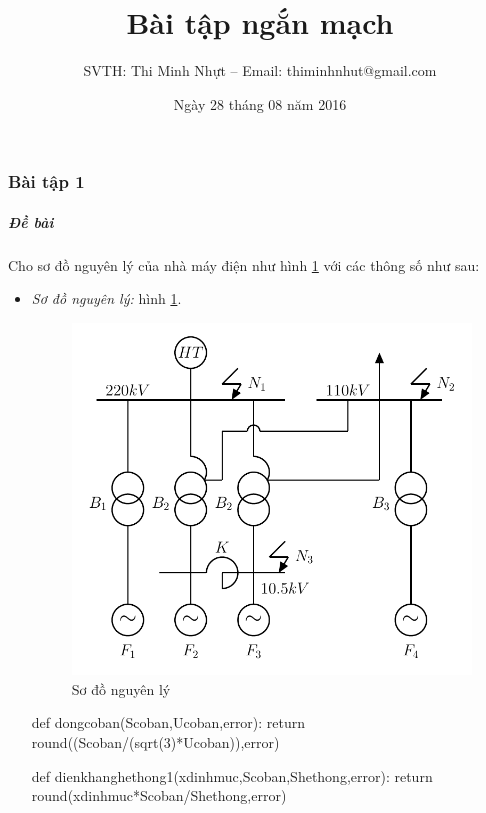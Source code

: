 \documentclass[12pt,a4paper]{article}
\title{\textbf{Bài tập ngắn mạch}}
\author{SVTH: Thi Minh Nhựt -- Email: thiminhnhut@gmail.com}
\date{Ngày 28 tháng 08 năm 2016}
\begin{document}
\maketitle
\everymath{\displaystyle}
\subsubsection*{Bài tập 1}
\subparagraph{Đề bài} Cho sơ đồ nguyên lý của nhà máy điện như hình \ref{Fig:baitap-ngan-mach-1} với các thông số như sau:
\begin{itemize}
\item \textit{Sơ đồ nguyên lý:} hình \ref{Fig:baitap-ngan-mach-1}.
\begin{figure}[!h]
\begin{center}
\includegraphics[scale=1]{figure-baitap-nganmach-1.pdf}
\end{center}
\caption{Sơ đồ nguyên lý}\label{Fig:baitap-ngan-mach-1}
\end{figure}

\begin{sagesilent}
def dongcoban(Scoban,Ucoban,error):
  return round((Scoban/(sqrt(3)*Ucoban)),error)
  
def dienkhanghethong1(xdinhmuc,Scoban,Shethong,error):
  return round(xdinhmuc*Scoban/Shethong,error)
  

\end{sagesilent}
\end{itemize}
\end{document}
